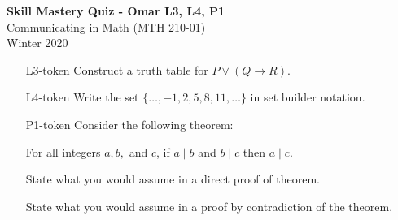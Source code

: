 \documentclass[10pt]{article}
\begin{document}
\vspace{-1.2in}
\begin{center} \textbf{\Large{Skill Mastery Quiz - Omar L3, L4, P1}} \\
Communicating in Math (MTH 210-01)\\
Winter 2020
\end{center}






\begin{itemize}
	

\item[L3-token] 	Construct a truth table for $P\vee (Q\rightarrow R)$.


\vfill
\vfill

\item[L4-token] Write the set $\{\dots, -1, 2, 5, 8, 11,\dots\}$ in set builder notation.
\vspace{2in}

\vfill
\newpage

\item [P1-token] Consider the following theorem:
	\begin{center}
	For all integers $a,b,$ and $c$, if $a\mid b$ and $b\mid c$ then $a\mid c$.
	\end{center}
State what you would assume in a direct proof of theorem.



\vfill
State what you would assume in a proof by contradiction of the theorem.
 

\vfill
\end{itemize}
	
\end{document}
